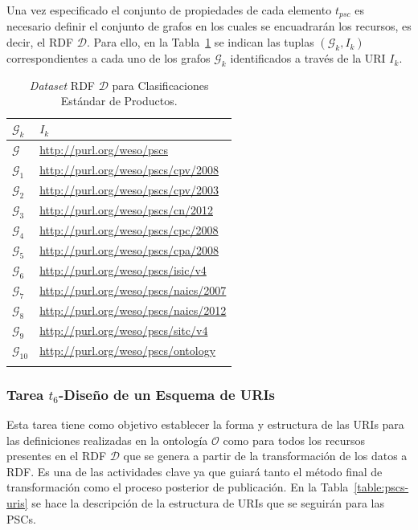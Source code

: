 Una vez especificado el conjunto de propiedades de cada elemento $t_{psc}$ es necesario definir el conjunto 
de grafos en los cuales se encuadrarán los recursos, es decir, el \dataset \gls{RDF} $\mathcal{D}$. Para ello, 
en la Tabla~\ref{table:pscs-dataset} se indican las tuplas $(\mathcal{G}_k, I_k)$ correspondientes a cada uno 
de los grafos $\mathcal{G}_k$ identificados a través de la URI $I_k$.

\begin{longtable}[c]{|p{3cm}|p{9cm}|} 
\hline
  \textbf{$\mathcal{G}_k$} &  \textbf{$I_k$}  \\\hline
\endhead
 \textbf{$\mathcal{G}$}   & \url{http://purl.org/weso/pscs} \\ \hline
 \textbf{$\mathcal{G}_1$} & \url{http://purl.org/weso/pscs/cpv/2008} \\ \hline
 \textbf{$\mathcal{G}_2$} & \url{http://purl.org/weso/pscs/cpv/2003} \\ \hline
 \textbf{$\mathcal{G}_3$} & \url{http://purl.org/weso/pscs/cn/2012} \\ \hline
 \textbf{$\mathcal{G}_4$} & \url{http://purl.org/weso/pscs/cpc/2008} \\ \hline
 \textbf{$\mathcal{G}_5$} & \url{http://purl.org/weso/pscs/cpa/2008} \\ \hline
 \textbf{$\mathcal{G}_6$} & \url{http://purl.org/weso/pscs/isic/v4} \\ \hline
 \textbf{$\mathcal{G}_7$} & \url{http://purl.org/weso/pscs/naics/2007} \\ \hline
 \textbf{$\mathcal{G}_8$} & \url{http://purl.org/weso/pscs/naics/2012} \\ \hline
 \textbf{$\mathcal{G}_9$} & \url{http://purl.org/weso/pscs/sitc/v4} \\ \hline
 \textbf{$\mathcal{G}_{10}$} & \url{http://purl.org/weso/pscs/ontology} \\ \hline 
\hline
\caption{\textit{Dataset} RDF $\mathcal{D}$ para Clasificaciones Estándar de Productos.}\label{table:pscs-dataset}\\    
\end{longtable}


\subsubsection{Tarea $t_6$-Diseño de un Esquema de URIs}
Esta tarea tiene como objetivo establecer la forma y estructura de las \gls{URI}s para las definiciones 
realizadas en la ontología $\mathcal{O}$ como para todos los recursos presentes en el \dataset RDF $\mathcal{D}$ que 
se genera a partir de la transformación de los datos a \gls{RDF}. Es una de las actividades clave ya que guiará 
tanto el método final de transformación como el proceso posterior de publicación. En la Tabla~\ref{table:pscs-uris} se 
hace la descripción de la estructura de URIs que se seguirán para las \gls{PSC}s.


